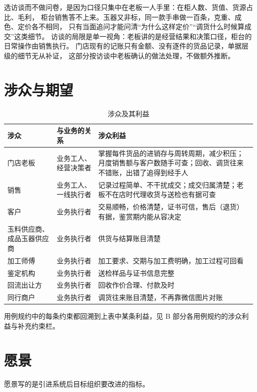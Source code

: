 选访谈而不做问卷，是因为口径只集中在老板一人手里：在柜人数、货值、货源占比、毛利，
柜台销售答不上来。玉器又非标，同一款手串做一百条，克重、成色、定价各不相同，
只有当面追问才能问清“为什么这样定价”“调货什么时候算成交”这类细节。
访谈的局限是单一视角：老板讲的是经营结果和决策口径，柜台的日常操作由销售执行。
门店现有的记账只有金额、没有逐件的货品记录，单据层级的细节无从补证，
这部分按访谈中老板确认的做法处理，不做额外推断。

\section{涉众与期望}

\begin{table}[H]
\centering
\caption{涉众及其利益}
\begin{tabularx}{\textwidth}{@{}l l Y@{}}
\toprule
涉众 & 与业务的关系 & 涉众利益 \\
\midrule
门店老板 & 业务工人、经营决策者 & 掌握每件货品的进销存与周转周期，减少积压；月度销售额与客户数随手可查；回收、调货往来不错账，出错了追得到经手人 \\
销售 & 业务工人、一线执行者 & 记录过程简单、不干扰成交；成交归属清楚；老板不在店时代理收货与送检也有据可查 \\
客户 & 业务执行者 & 交易顺畅，价格清楚，证书可信，售后（退货）有据，鉴赏期内能从容决定 \\
玉料供应商、成品玉器供应商 & 业务执行者 & 供货与结算账目清楚 \\
加工师傅 & 业务执行者 & 加工要求、交期与加工费明确，加工过程可回看 \\
鉴定机构 & 业务执行者 & 送检样品与证书信息完整 \\
回流出让方 & 业务执行者 & 回收作价合理、付款及时 \\
同行商户 & 业务执行者 & 调货往来账目清楚，不再靠微信图片对账 \\
\bottomrule
\end{tabularx}
\end{table}

\noindent
用例规约中的每条约束都回溯到上表中某条利益，见 B 部分各用例规约的涉众利益与补充约束栏。

\section{愿景}

愿景写的是引进系统后目标组织要改进的指标。

